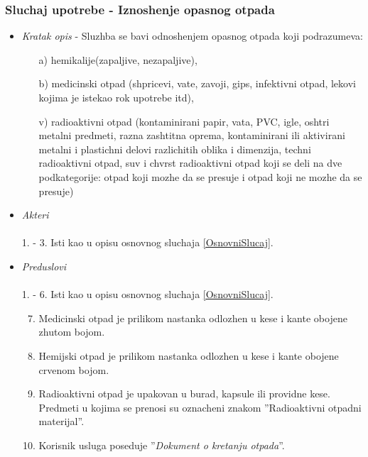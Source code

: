\documentclass[10 pt]{article}
\begin{document}
 	\newpage

	\subsubsection{Sluchaj upotrebe - Iznoshenje opasnog otpada}
		
		\begin{itemize}
			
			\item\textit{Kratak opis} - Sluzhba se bavi odnoshenjem opasnog otpada koji podrazumeva: 
				\begin{enumerate}
					\item[a)] hemikalije(zapaljive, nezapaljive),
					\item[b)] medicinski otpad (shpricevi, vate, zavoji, gips, infektivni otpad, lekovi kojima je istekao rok upotrebe itd),
					\item[v)] radioaktivni otpad (kontaminirani papir, vata, PVC, igle, oshtri metalni predmeti, razna zashtitna oprema, kontaminirani ili aktivirani metalni i plastichni delovi razlichitih oblika i dimenzija, techni radioaktivni otpad, suv i chvrst radioaktivni otpad koji se deli na  dve  podkategorije:
						otpad  koji  mozhe da se presuje i otpad koji ne mozhe da se presuje)
				\end{enumerate}
			
			
			\item\textit{Akteri}\\\\ 
				1. - 3. Isti kao u opisu osnovnog sluchaja \ref{OsnovniSlucaj}. 
					 
			\item\textit{Preduslovi}\\\\ 
				1. - 6. Isti kao u opisu osnovnog sluchaja \ref{OsnovniSlucaj}.
				\begin{enumerate}
					\setcounter{enumi}{6}
					\item Medicinski otpad je prilikom nastanka odlozhen u kese i kante obojene zhutom bojom.
					\item Hemijski otpad je prilikom nastanka odlozhen u kese i kante obojene crvenom bojom.
					\item Radioaktivni otpad je upakovan u burad, kapsule ili providne kese. Predmeti u kojima se prenosi su oznacheni znakom ''Radioaktivni otpadni materijal''.
					\item Korisnik usluga poseduje ''\textit{Dokument o kretanju otpada}''.
				\end{enumerate}
		

\end{itemize}
\end{document}
